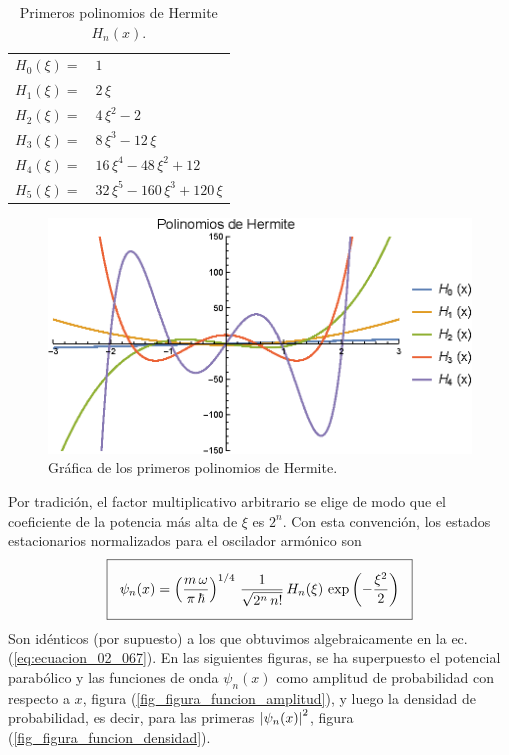 \documentclass[12pt]{article}
\numberwithin{equation}{section}
\begin{document}
\begin{center}
\begin{table}[H]
\large
\centering
\begin{tabular}{l l}
$H_{0}(\xi) =$ & $1$ \\
$H_{1}(\xi) =$ & $2 \, \xi$ \\
$H_{2}(\xi) =$ & $4 \, \xi^{2} - 2 $ \\
$H_{3}(\xi) =$ & $8 \, \xi^{3} - 12 \, \xi$ \\
$H_{4}(\xi) =$ & $16 \, \xi^{4} - 48 \, \xi^{2} + 12 $ \\
$H_{5}(\xi) =$ & $32 \, \xi^{5} - 160 \, \xi^{3} + 120 \, \xi$
\end{tabular}
\caption{Primeros polinomios de Hermite $H_{n}(x)$.}
\label{tabla_001}
\end{table}
\begin{figure}[H]
    \centering
    \includegraphics[scale=1]{Imagenes/Plot_Hermite_01.eps}
    \caption{Gráfica de los primeros polinomios de Hermite.}
    \label{figura_003}
\end{figure}
\end{center}
Por tradición, el factor multiplicativo arbitrario se elige de modo que el coeficiente de la potencia más alta de $\xi$ es $2^{n}$. Con esta convención, los estados estacionarios normalizados para el oscilador armónico son
\begin{align}
\setlength{\fboxsep}{3\fboxsep}\boxed{
\psi_{n} (x) = \left( \dfrac{m \, \omega}{\pi \, \hbar} \right)^{1/4} \, \dfrac{1}{\sqrt{2^{n} \, n!}} \, H_{n} (\xi) \, \exp \left( - \dfrac{\xi^{2}}{2} \right)}
\label{eq:ecuacion_02_069}
\end{align}
Son idénticos (por supuesto) a los que obtuvimos algebraicamente en la ec. (\ref{eq:ecuacion_02_067}).
\newpage
En las siguientes figuras, se ha superpuesto el potencial parabólico y las funciones de onda $\psi_{n} (x)$ como amplitud de probabilidad con respecto a $x$, figura (\ref{fig_figura_funcion_amplitud}), y luego la densidad de probabilidad, es decir, para las primeras $\abs{\psi_{n} (x)}^{2}$, figura (\ref{fig_figura_funcion_densidad}).
\end{document}
